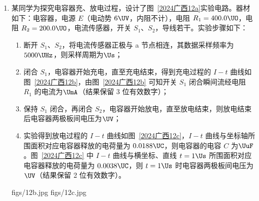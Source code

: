 \documentclass[\gkver]{gaokaozhenti}
\begin{document}
\begin{enumerate}

\item
某同学为探究电容器充、放电过程，设计了图~\ref{2024广西12a}实验电路。器材如下：电容器，电源 $E$（电动势 $6 \UV$，内阻不计），电阻 $R_{1} = 400.0 \UO$，电阻 $R_{2} = 200.0 \UO$，电流传感器，开关 $S_{1}$、$S_{2}$，导线若干。实验步骤如下：
\begin{enumerate}
	\item
	断开 $S_{1}$、$S_{2}$，将电流传感器正极与 a 节点相连，其数据采样频率为 $5000 \UHz$，则采样周期为$\Us$；
	\item
	闭合 $S_{1}$，电容器开始充电，直至充电结束，得到充电过程的 $I - t$ 曲线如图~\ref{2024广西12b}，由图~\ref{2024广西12b} 可知开关 $S_{1}$ 闭合瞬间流经电阻 $R_{1}$ 的电流为$\UmA$（结果保留 3 位有效数字）；
	\item
	保持 $S_{1}$ 闭合，再闭合 $S_{2}$，电容器开始放电，直至放电结束，则放电结束后电容器两极板间电压为$\UV$；
	\item
	实验得到放电过程的 $I - t$ 曲线如图~\ref{2024广西12c}，$I - t$ 曲线与坐标轴所围面积对应电容器释放的电荷量为 $0.0188 \UC$，则电容器的电容 $C$ 为$\UuF$。图~\ref{2024广西12c} 中 $I - t$ 曲线与横坐标、直线 $t = 1 \Us$ 所围面积对应电容器释放的电荷量为 $0.0038 \UC$，则 $t = 1 \Us$ 时电容器两极板间电压为$\UV$（结果保留 2 位有效数字）。
\end{enumerate}
{figs/12b.jpg}
{figs/12c.jpg}


\end{enumerate}
\end{document}
